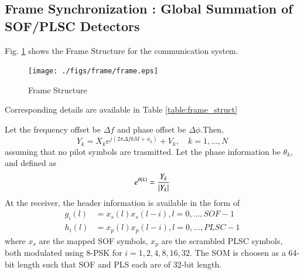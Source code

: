 \subsection{Frame Synchronization : Global Summation of SOF/PLSC Detectors} 
%
Fig. \ref{fig:frame_struct} shows the Frame Structure for the communication system.
%
\begin{figure}[!ht]
\begin{center}
\texttt{[image: ./figs/frame/frame.eps]}
\end{center}
\caption{Frame Structure}
\label{fig:frame_struct}
\end{figure}
Corresponding details are available in Table \ref{table:frame_struct}
\begin{table}[!ht]
\begin{center}

\end{center}
\caption{}
\label{table:frame_struct}
\end{table}
Let the frequency offset be $\Delta f$ and phase offset be $\Delta \phi$.Then,
\begin{equation}
Y_k= X_k e^{j(2\pi\Delta fkM+\phi_k)} + V_k, \quad k = 1,\dots,N 
\end{equation}
%
assuming that no pilot symbols are trasmitted. 
Let the phase information be $\theta_k$, and defined as
%
\begin{equation}
e^{\theta(k)} = \frac{Y_k}{\left\vert Y_k\right\vert}
\end{equation}
%
At the receiver, the header information is available in the form of 
\begin{align}
g_i(l)&=x_s(l)x_s(l-i), l = 0,\dots, SOF-1
\\
h_i(l)&=x_p(l)x_p(l-i), l = 0,\dots, PLSC-1
\end{align}
%
where $x_s$ are the mapped SOF symbols, $x_p$ are the scrambled PLSC  symbols, both  modulated using 8-PSK
for $i=1,2,4,8,16,32$.
The SOM is choosen as a 64-bit length such that SOF and PLS each are of 32-bit length.

